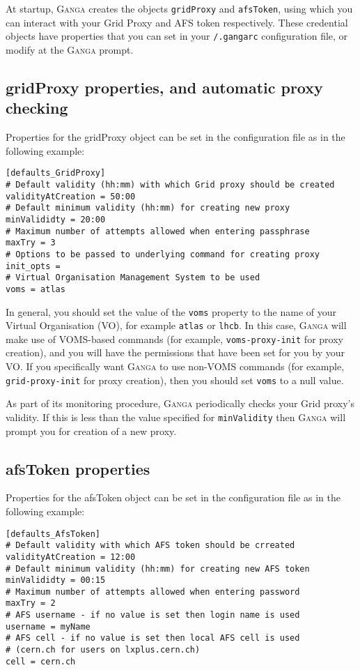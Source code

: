 \documentclass{howto}
\def\ganga {\textsc{Ganga}\xspace}
\begin{document}
At startup, \ganga creates the objects \texttt{gridProxy}
and \texttt{afsToken}, using which you can interact with your Grid Proxy
and AFS token respectively.  These credential objects have properties
that you can set in your \texttt{/.gangarc} configuration file, or modify
at the \ganga prompt.

\subsection{gridProxy properties, and automatic proxy checking}
Properties for the gridProxy object can be set in the configuration file as
in the following example:

\begin{verbatim}
[defaults_GridProxy]
# Default validity (hh:mm) with which Grid proxy should be created
validityAtCreation = 50:00
# Default minimum validity (hh:mm) for creating new proxy
minValididty = 20:00
# Maximum number of attempts allowed when entering passphrase
maxTry = 3
# Options to be passed to underlying command for creating proxy
init_opts =
# Virtual Organisation Management System to be used
voms = atlas
\end{verbatim}

In general, you should set the value of the \texttt{voms} property to
the name of your Virtual Organisation (VO), for example \texttt{atlas} or
\texttt{lhcb}.  In this case, \ganga will make use of VOMS-based commands
(for example, \texttt{voms-proxy-init} for proxy creation), and you will
have the permissions that have been set for you by your VO.  If you
specifically want \ganga to use non-VOMS commands (for example,
\texttt{grid-proxy-init} for proxy creation), then you should set
\texttt{voms} to a null value.

As part of its monitoring procedure, \ganga periodically checks
your Grid proxy's validity.  If this is less than the value
specified for \texttt{minValidity} then \ganga will prompt
you for creation of a new proxy.

\subsection{afsToken properties}

Properties for the afsToken object can be set in the configuration file as
in the following example:

\begin{verbatim}
[defaults_AfsToken]
# Default validity with which AFS token should be crreated
validityAtCreation = 12:00
# Default minimum validity (hh:mm) for creating new AFS token
minValididty = 00:15
# Maximum number of attempts allowed when entering password
maxTry = 2
# AFS username - if no value is set then login name is used
username = myName
# AFS cell - if no value is set then local AFS cell is used
# (cern.ch for users on lxplus.cern.ch)
cell = cern.ch
\end{verbatim}
\end{document}
